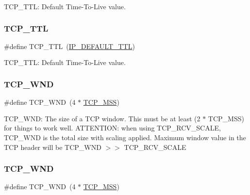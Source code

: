 T\+C\+P\+\_\+\+T\+TL\+: Default Time-\/\+To-\/\+Live value. \mbox{\label{group__lwip__opts__tcp_gacd5b25ea81d2894790d25da5393cdab4}} 
\subsubsection{\texorpdfstring{T\+C\+P\+\_\+\+T\+TL}{TCP\_TTL}\hspace{0.1cm}{\footnotesize\ttfamily [2/2]}}
{\footnotesize\ttfamily \#define T\+C\+P\+\_\+\+T\+TL~(\hyperlink{group__lwip__opts__ipv4_ga556b9b58fd02c0fdd126791baef77411}{I\+P\+\_\+\+D\+E\+F\+A\+U\+L\+T\+\_\+\+T\+TL})}

T\+C\+P\+\_\+\+T\+TL\+: Default Time-\/\+To-\/\+Live value. \mbox{\label{group__lwip__opts__tcp_ga7f535a6efb5cdf86c3210e35ece1d6a7}} 
\subsubsection{\texorpdfstring{T\+C\+P\+\_\+\+W\+ND}{TCP\_WND}\hspace{0.1cm}{\footnotesize\ttfamily [1/2]}}
{\footnotesize\ttfamily \#define T\+C\+P\+\_\+\+W\+ND~(4 $\ast$ \hyperlink{group__lwip__opts__tcp_gaf1ab7bb27860aa3677c387a2f3ba317b}{T\+C\+P\+\_\+\+M\+SS})}

T\+C\+P\+\_\+\+W\+ND\+: The size of a T\+CP window. This must be at least (2 $\ast$ T\+C\+P\+\_\+\+M\+SS) for things to work well. A\+T\+T\+E\+N\+T\+I\+ON\+: when using T\+C\+P\+\_\+\+R\+C\+V\+\_\+\+S\+C\+A\+LE, T\+C\+P\+\_\+\+W\+ND is the total size with scaling applied. Maximum window value in the T\+CP header will be T\+C\+P\+\_\+\+W\+ND $>$$>$ T\+C\+P\+\_\+\+R\+C\+V\+\_\+\+S\+C\+A\+LE \mbox{\label{group__lwip__opts__tcp_ga7f535a6efb5cdf86c3210e35ece1d6a7}} 
\subsubsection{\texorpdfstring{T\+C\+P\+\_\+\+W\+ND}{TCP\_WND}\hspace{0.1cm}{\footnotesize\ttfamily [2/2]}}
{\footnotesize\ttfamily \#define T\+C\+P\+\_\+\+W\+ND~(4 $\ast$ \hyperlink{group__lwip__opts__tcp_gaf1ab7bb27860aa3677c387a2f3ba317b}{T\+C\+P\+\_\+\+M\+SS})}


